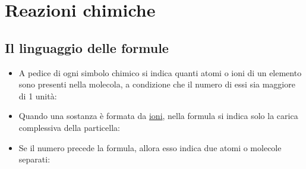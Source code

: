\documentclass{article}
\begin{document}
\section{Reazioni chimiche}
\subsection{Il linguaggio delle formule}
\begin{itemize}
    \item A pedice di ogni simbolo chimico si indica quanti atomi o ioni di un elemento sono presenti
        nella molecola, a condizione che il numero di essi sia maggiore di 1 unità:
    \begin{figure}[h!]
        \begin{center}
        \end{center}
    \end{figure}

    \item Quando una sostanza è formata da \underline{ioni}, nella formula si indica solo la
        carica complessiva della particella:
    \begin{figure}[h!]
        \begin{center}
        \end{center}
    \end{figure}

    \item Se il numero precede la formula, allora esso indica due atomi o molecole separati:
    \begin{figure}[h!]
        \begin{center}
        \end{center}
    \end{figure}


\end{itemize}
\end{document}
